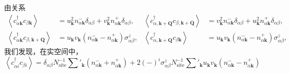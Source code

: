 由关系
\begin{align*}
\left\langle c^{\dagger}_{\alpha\pmb{k}}c_{\beta\pmb{k}}\right\rangle&=u^{2}_{\pmb{k}}n^{-}_{\alpha\pmb{k}}\delta_{\alpha\beta}+v^{2}_{\pmb{k}}n^{+}_{\alpha\pmb{k}}\delta_{\alpha\beta}, & \left\langle c^{\dagger}_{\alpha,\pmb{k}+\pmb{Q}}c_{\beta,\pmb{k}+\pmb{Q}}\right\rangle&=v^{2}_{\pmb{k}}n^{-}_{\alpha\pmb{k}}\delta_{\alpha\beta}+u^{2}_{\pmb{k}}n^{+}_{\alpha\pmb{k}}\delta_{\alpha\beta},\\
\left\langle c^{\dagger}_{\alpha\pmb{k}}c_{\beta,\pmb{k}+\pmb{Q}}\right\rangle&=u_{\pmb{k}}v_{\pmb{k}}(n^{-}_{\alpha\pmb{k}}-n^{+}_{\alpha\pmb{k}})\sigma^{z}_{\alpha\beta}, & \left\langle c^{\dagger}_{\alpha,\pmb{k}+\pmb{Q}}c_{\beta\pmb{k}}\right\rangle&=u_{\pmb{k}}v_{\pmb{k}}(n^{-}_{\alpha\pmb{k}}-n^{+}_{\alpha\pmb{k}})\sigma^{z}_{\alpha\beta},
\end{align*}
我们发现，在实空间中，
\begin{equation*}
\left\langle c^{\dagger}_{\alpha i}c_{\beta i}\right\rangle=\delta_{\alpha\beta}N^{-1}_{\mathrm{site}}\sum'_{\pmb{k}}(n^{-}_{\alpha\pmb{k}}+n^{+}_{\alpha\pmb{k}})+2(-)^{i}\sigma^{z}_{\alpha\beta}N^{-1}_{\mathrm{site}}\sum'_{\pmb{k}}u_{\pmb{k}}v_{\pmb{k}}(n^{-}_{\alpha\pmb{k}}-n^{+}_{\alpha\pmb{k}})
\end{equation*}
